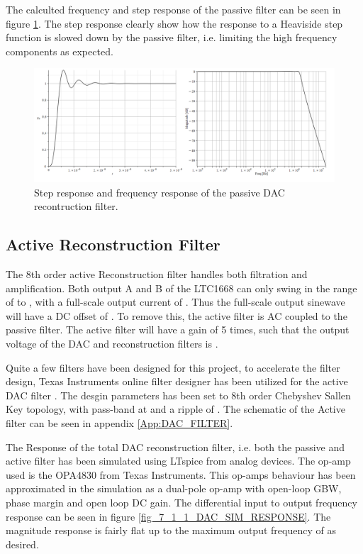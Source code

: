 The calculted frequency and step response of the passive filter can be seen in figure \ref{fig_7_1_1_DAC_PASSIVE_RESPONSE}. The step response clearly show how the response to a Heaviside step function is slowed down by the passive filter, i.e. limiting the high frequency components as expected.

\begin{figure}[H]
    \centering
    \includegraphics[clip, trim=0 0 0 0, width=1\textwidth]{Sections/7_SystemDesign/Figures/7_1_1_DAC_PASSIVE_RESPONSE.pdf}
    \caption{Step response and frequency response of the passive DAC recontruction filter.}
    \label{fig_7_1_1_DAC_PASSIVE_RESPONSE}
\end{figure}


\subsection*{Active Reconstruction Filter}
The 8th order active Reconstruction filter handles both filtration and amplification. Both output A and B of the LTC1668 can only swing in the range of  to , with a full-scale output current of . Thus the full-scale output sinewave will have a DC offset of . To remove this, the active filter is AC coupled to the passive filter. The active filter will have a gain of 5 times, such that the output voltage of the DAC and reconstruction filters is .

Quite a few filters have been designed for this project, to accelerate the filter design, Texas Instruments online filter designer has been utilized for the active DAC filter \cite{TI_FILTER_TOOL}. The desgin parameters has been set to 8th order Chebyshev Sallen Key topology, with pass-band at  and a ripple of . The schematic of the Active filter can be seen in appendix \ref{App:DAC_FILTER}.

The Response of the total DAC reconstruction filter, i.e. both the passive and active filter has been simulated using LTspice from analog devices. The op-amp used is the OPA4830 from Texas Instruments. This op-amps behaviour has been approximated in the simulation as a dual-pole op-amp with  open-loop GBW,  phase margin and  open loop DC gain. The differential input to output frequency response can be seen in figure \ref{fig_7_1_1_DAC_SIM_RESPONSE}. The magnitude response is fairly flat up to the maximum output frequency of  as desired.

